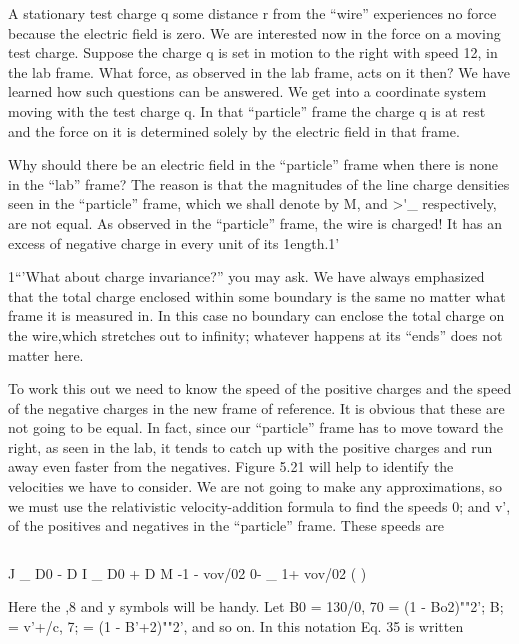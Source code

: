 A stationary test charge q some distance r from the ``wire'' experiences
no force because the electric field is zero. We are interested
now in the force on a moving test charge. Suppose the charge q is set
in motion to the right with speed 12, in the lab frame. What force, as
observed in the lab frame, acts on it then? We have learned how such
questions can be answered. We get into a coordinate system moving
with the test charge q. In that ``particle'' frame the charge q is at
rest and the force on it is determined solely by the electric field in
that frame.

Why should there be an electric field in the ``particle'' frame when
there is none in the ``lab'' frame? The reason is that the magnitudes
of the line charge densities seen in the ``particle'' frame, which we
shall denote by M, and >\'_ respectively, are not equal. As observed
in the ``particle'' frame, the wire is charged! It has an excess of negative
charge in every unit of its 1ength.1'

1``'What about charge invariance?'' you may ask. We have always emphasized that
the total charge enclosed within some boundary is the same no matter what frame it is
measured in. In this case no boundary can enclose the total charge on the wire,which
stretches out to infinity; whatever happens at its ``ends'' does not matter here.

To work this out we need to know the speed of the positive charges
and the speed of the negative charges in the new frame of reference.
It is obvious that these are not going to be equal. In fact, since our
``particle'' frame has to move toward the right, as seen in the lab, it
tends to catch up with the positive charges and run away even faster
from the negatives. Figure 5.21 will help to identify the velocities we
have to consider. We are not going to make any approximations, so
we must use the relativistic velocity-addition formula to find the
speeds 0; and v', of the positives and negatives in the ``particle''
frame. These speeds are

\begin{equation}
\end{equation}

J _ D0 - D I _ D0 + D 
M -1 - vov/02 0- _ 1+ vov/02 ( )

Here the ,8 and y symbols will be handy. Let B0 = 130/0, 70 =
(1 - Bo2)""2'; B; = v'+/c, 7; = (1 - B'+2)""2', and so on. In
this notation Eq. 35 is written

\begin{equation}
\end{equation}

